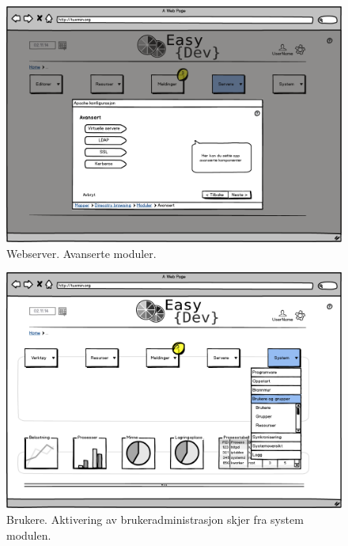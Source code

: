 \begin{figure}[ht]
\centering
\includegraphics[width=\lowB\textwidth,height=\textheight,keepaspectratio]{./img/prosessdokumentasjon/lowfi/apache5.png}
\caption[Low-fi Webserver 5]{Webserver. Avanserte moduler.}
\label{fig:apachelow5}
\end{figure}

\begin{figure}[ht]
\centering
\includegraphics[width=\lowB\textwidth,height=\textheight,keepaspectratio]{./img/prosessdokumentasjon/lowfi/b1.png}
\caption[Low-fi Brukere 1]{Brukere. Aktivering av brukeradministrasjon skjer fra system modulen.}
\label{fig:brukerelow1}
\end{figure}

